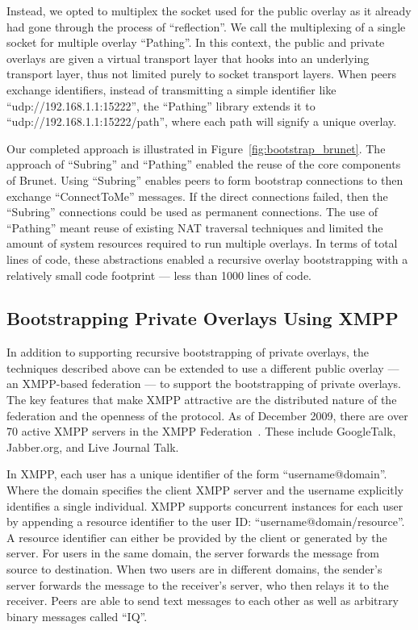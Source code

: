 \documentclass[conference]{IEEEtran}
\begin{document}
Instead, we opted to multiplex the socket used for the public overlay as it
already had gone through the process of ``reflection''.  We call the
multiplexing of a single socket for multiple overlay ``Pathing''.  In this
context, the public and private overlays are given a virtual transport layer
that hooks into an underlying transport layer, thus not limited purely to
socket transport layers.  When peers exchange identifiers, instead of
transmitting a simple identifier like ``udp://192.168.1.1:15222'', the
``Pathing'' library extends it to ``udp://192.168.1.1:15222/path'', where each
path will signify a unique overlay.

Our completed approach is illustrated in Figure~\ref{fig:bootstrap_brunet}.
The approach of ``Subring'' and ``Pathing'' enabled the reuse of the core
components of Brunet.  Using ``Subring'' enables peers to form bootstrap
connections to then exchange ``ConnectToMe'' messages.  If the direct
connections failed, then the ``Subring'' connections could be used as permanent
connections.  The use of ``Pathing'' meant reuse of existing NAT traversal
techniques and limited the amount of system resources required to run multiple
overlays.  In terms of total lines of code, these abstractions enabled a
recursive overlay bootstrapping with a relatively small code footprint --- less
than 1000 lines of code.

\subsection{Bootstrapping Private Overlays Using XMPP}
\label{xmpp_bootstrapping}

In addition to supporting recursive bootstrapping of private overlays, the
techniques described above can be extended to use a different public overlay
--- an XMPP-based federation --- to support the bootstrapping of private
overlays.  The key features that make XMPP attractive are the distributed
nature of the federation and the openness of the protocol.  As of December
2009, there are over 70 active XMPP servers in the XMPP
Federation~\cite{xmpp_servers}.  These include GoogleTalk, Jabber.org, and Live
Journal Talk.

In XMPP, each user has a unique identifier of the form ``username@domain''.
Where the domain specifies the client XMPP server and the username explicitly
identifies a single individual.  XMPP supports concurrent instances for each
user by appending a resource identifier to the user ID:
``username@domain/resource''.  A resource identifier can either be provided by
the client or generated by the server.  For users in the same domain, the
server forwards the message from source to destination.  When two users are in
different domains, the sender's server forwards the message to the receiver's
server, who then relays it to the receiver.  Peers are able to send text
messages to each other as well as arbitrary binary messages called ``IQ''.
\end{document}
